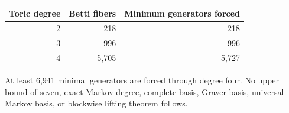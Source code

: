 \begin{center}
\begin{tabular}{@{}rrr@{}}
\toprule
Toric degree & Betti fibers & Minimum generators forced\\
\midrule
2 & 218 & 218\\
3 & 996 & 996\\
4 & 5,705 & 5,727\\
\bottomrule
\end{tabular}
\end{center}

At least 6,941 minimal generators are forced through degree four.  No upper
bound of seven, exact Markov degree, complete basis, Graver basis, universal
Markov basis, or blockwise lifting theorem follows.
